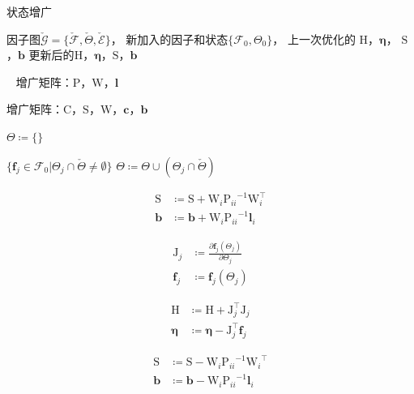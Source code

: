 \begin{algorithm}
\caption{状态增广}
\begin{algorithmic}
    \Require 因子图$\check{\mathcal{G}}=\{\check{\mathcal{F}},\check{\Theta},\check{\mathcal{E}}\}$，
             新加入的因子和状态$\{\mathcal{F}_0,\Theta_0\}$，
             上一次优化的
             $\mathrm{H}$，$\bm{\eta}$，
             $\mathrm{S}$，$\bm{b}$
    \Ensure 更新后的$\mathrm{H}$，$\bm{\eta}$，$\mathrm{S}$，$\bm{b}$

    ~
        \State 增广矩阵：$\mathrm{P}$，$\mathrm{W}$，$\bm{l}$
    \EndFor

        \State 增广矩阵：$\mathrm{C}$，$\mathrm{S}$，$\mathrm{W}$，$\bm{c}$，$\bm{b}$
    \EndFor

    \State $\Theta\coloneqq\{\}$
    ~

    \ForAll
    {$\{
            \bm{f}_j\in\mathcal{F}_0 |
            \Theta_j \cap \check{\Theta} \neq \emptyset
    \}$}
        \State $\Theta \coloneqq \Theta \cup (\Theta_j \cap \check{\Theta})$
    \EndFor

        \[\begin{aligned}
                \mathrm{S} &\coloneqq \mathrm{S} + \mathrm{W}_i{\mathrm{P}_{ii}}^{-1}\mathrm{W}_i^\top \\
                \bm{b}     &\coloneqq \bm{b}     + \mathrm{W}_i{\mathrm{P}_{ii}}^{-1}\bm{l}_i
        \end{aligned}\]
    \EndFor

        \[\begin{aligned}
                \mathrm{J}_j &\coloneqq \frac{\partial{\bm{f}_j}(\Theta_j)}
                                             {\partial{\Theta_j}} \\
                \bm{f}_j     &\coloneqq \bm{f}_j(\Theta_j)
        \end{aligned}\]

        \[\begin{aligned}
                \mathrm{H} &\coloneqq \mathrm{H} + \mathrm{J}_j^\top\mathrm{J}_j \\
                \bm{\eta}  &\coloneqq \bm{\eta}  - \mathrm{J}_j^\top\bm{f}_j
        \end{aligned}\]
    \EndFor

        \[\begin{aligned}
                \mathrm{S} &\coloneqq \mathrm{S} - \mathrm{W}_i{\mathrm{P}_{ii}}^{-1}{\mathrm{W}_i}^\top \\
                \bm{b}     &\coloneqq \bm{b}     - \mathrm{W}_i{\mathrm{P}_{ii}}^{-1}\bm{l}_i
        \end{aligned}\]
    \EndFor

\end{algorithmic}
\label{alg:factor_graph_aug}
\end{algorithm}
